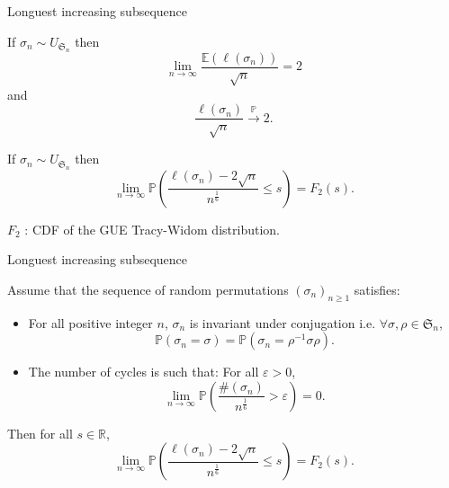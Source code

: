 \documentclass[english]{beamer}
\begin{document}
\begin{frame}{Longuest increasing subsequence}
\begin{theorem}
  If $\sigma_n \sim {U}_{\mathfrak{S}_n}$ then
    $$\lim_{n\to \infty}\frac{\mathbb{E}(\ell(\sigma_n))}{\sqrt{n}}=2$$
    and
    $$ \frac{\ell(\sigma_n)}{\sqrt{n}} \overset{\mathbb{P}}\to 2.$$ 
\end{theorem}
\begin{theorem}  \label{dbj}
 If $\sigma_n \sim {U}_{\mathfrak{S}_n}$ then
\begin{equation*} 
\lim_{n \to \infty} \mathbb{P}\left(\frac{\ell(\sigma_n)-2\sqrt{n}}{n^\frac 16}\leq s\right)=F_2(s).
\end{equation*}
\end{theorem}
    $F_2$ : CDF of the GUE Tracy-Widom distribution. 
\end{frame}

\begin{frame}{Longuest increasing subsequence}
    \begin{theorem}[\cite{sk}]
Assume that the sequence of random permutations  $(\sigma_n)_{n\geq 1}$ satisfies:
\begin{itemize}
\item  For all positive integer $n$, $\sigma_n$ is invariant under conjugation i.e.  $\forall \sigma , \rho \in \mathfrak{S}_n$,
\begin{equation}\tag{H1}\label{h1}
\mathbb{P}(\sigma_n=\sigma)=\mathbb{P}(\sigma_n=\rho^{-1}\sigma\rho).
\end{equation}
\item The number of cycles is such that: For all $\varepsilon>0$,
\begin{equation}\tag{H2}\label{h2}
\lim_{n\to \infty}\mathbb{P}\left(\frac{\#(\sigma_n)}{n^\frac 16 }>\varepsilon\right) =0.
\end{equation}
\end{itemize}
Then  for all  $s \in \mathbb{R}$,
\begin{equation*} 
\lim_{n\to \infty} \mathbb{P}\left(\frac{\ell(\sigma_n)-2\sqrt{n}}{n^\frac 16}\leq s\right)=F_2(s).
\end{equation*}
\end{theorem}
\end{frame}
\end{document}
